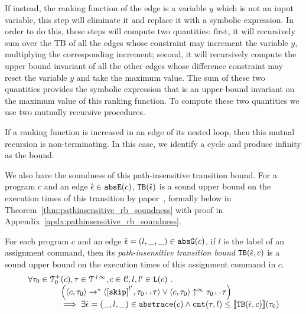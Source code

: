  If instead, the ranking function of the edge is a variable $y$ which is not an input variable, this step will eliminate it and replace it with a symbolic expression. 
 In order to do this, these steps will compute two quantities: first, it will recursively sum over the TB of all the edges whose constraint may increment the variable $y$, multiplying the corresponding increment; second, it will recursively compute the upper bound invariant of all the other edges whose difference constraint may reset the variable $y$ and take the maximum value. The sum of these two quantities provides the symbolic expression that is an upper-bound invariant on the maximum value of this ranking function. To compute these two quantities we use two mutually recursive procedures.
 
 If a ranking function is increased in an edge of its nested loop, then this mutual recursion is non-terminating. In this case, we identify a cycle and produce infinity as the bound.
 
 
We also have the soundness of this path-insensitive transition bound. For a program $c$ and an edge $\hat{\mathtt{\epsilon}{}} \in \mathtt{abs}{\mathtt{E}}(c)$,
${\mathtt{TB}}(\hat{\mathtt{\epsilon}{}})$ is a sound upper bound
on the execution times of this transition by paper~\cite{SinnZV17}, formally below in Theorem~\ref{thm:pathinsensitive_rb_soundness} with proof in Appendix~\ref{apdx:pathinsensitive_rb_soundness}.
%
\begin{thm}
 \label{thm:pathinsensitive_rb_soundness}
For each program ${c}$ and an edge $\hat{\mathtt{\epsilon}{}} = (l, \_, \_) \in \mathtt{abs}{\mathtt{G}}(c)$, if $l$ is the label of an assignment command,
then its \emph{path-insensitive transition bound} ${\mathtt{TB}}(\hat{\mathtt{\epsilon}{}}, c)$ 
 is a sound upper bound on 
the execution times of this assignment command in $c$.
 \[
 \begin{array}{l}
 \forall \trace_0 \in \ftdom_0(c), \trace \in \tdom, c \in \cdom, l, l' \in \lvar(c) \st
 \\ \qquad \qquad
 \Big( \config{c, \trace_0} \rightarrow^{*} \config{\clabel{\eskip}^{l'}, \trace_0 \tracecat \trace} 
 \lor \config{c, \trace_0} \uparrow^{\infty} \trace_0 \tracecat \trace \Big)
 \\ \qquad \qquad
 \implies
 \exists \absevent = (\_, l, \_) \in \absflow(c) \land
 \counter(\trace, l) \leq \econfig{\absclr(\absevent, c)}(\trace_0)
 \end{array}
 \]
\end{thm}
%
